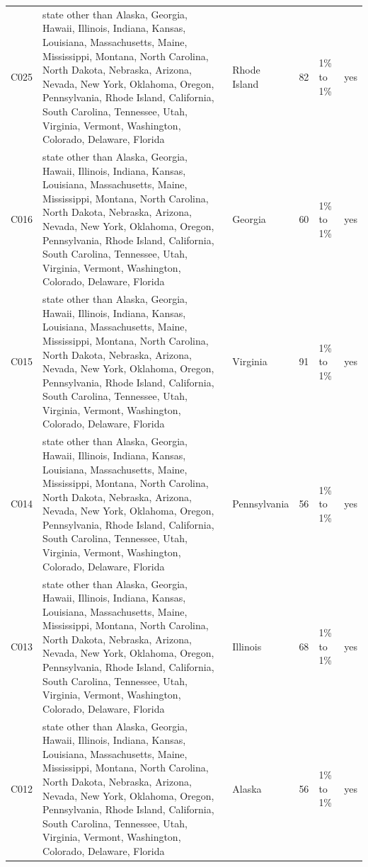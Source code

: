 \documentclass[a4paper,10pt]{article}
\newif\ifreviewmarks
\newcommand{\reviewrule}{\noindent{\color{BrickRed}\rule{\linewidth}{0.8pt}}}
\newenvironment{drafted}[1][]{%
  \ifreviewmarks\par\addvspace{\medskipamount}\reviewrule\par\nopagebreak
  \noindent{\color{BrickRed}\sffamily\footnotesize\textbf{Thesis Draft}\quad #1\hfill review}\par\nopagebreak\smallskip\fi}{%
  \ifreviewmarks\par\smallskip\noindent{\color{BrickRed}\sffamily\footnotesize end of thesis draft}\par\nopagebreak\reviewrule\par\medskip\fi}
\begin{document}
\begin{drafted}[plain-language layer: churn100-s4-c3]
{\begin{longtable}{@{}lllrlc@{}}
C025 & state other than Alaska, Georgia, Hawaii, Illinois, Indiana, Kansas, Louisiana, Massachusetts, Maine, Mississippi, Montana, North Carolina, North Dakota, Nebraska, Arizona, Nevada, New York, Oklahoma, Oregon, Pennsylvania, Rhode Island, California, South Carolina, Tennessee, Utah, Virginia, Vermont, Washington, Colorado, Delaware, Florida & Rhode Island & 82 & 1\% to 1\% & \textcolor{OliveGreen}{yes} \\
C016 & state other than Alaska, Georgia, Hawaii, Illinois, Indiana, Kansas, Louisiana, Massachusetts, Maine, Mississippi, Montana, North Carolina, North Dakota, Nebraska, Arizona, Nevada, New York, Oklahoma, Oregon, Pennsylvania, Rhode Island, California, South Carolina, Tennessee, Utah, Virginia, Vermont, Washington, Colorado, Delaware, Florida & Georgia & 60 & 1\% to 1\% & \textcolor{OliveGreen}{yes} \\
C015 & state other than Alaska, Georgia, Hawaii, Illinois, Indiana, Kansas, Louisiana, Massachusetts, Maine, Mississippi, Montana, North Carolina, North Dakota, Nebraska, Arizona, Nevada, New York, Oklahoma, Oregon, Pennsylvania, Rhode Island, California, South Carolina, Tennessee, Utah, Virginia, Vermont, Washington, Colorado, Delaware, Florida & Virginia & 91 & 1\% to 1\% & \textcolor{OliveGreen}{yes} \\
C014 & state other than Alaska, Georgia, Hawaii, Illinois, Indiana, Kansas, Louisiana, Massachusetts, Maine, Mississippi, Montana, North Carolina, North Dakota, Nebraska, Arizona, Nevada, New York, Oklahoma, Oregon, Pennsylvania, Rhode Island, California, South Carolina, Tennessee, Utah, Virginia, Vermont, Washington, Colorado, Delaware, Florida & Pennsylvania & 56 & 1\% to 1\% & \textcolor{OliveGreen}{yes} \\
C013 & state other than Alaska, Georgia, Hawaii, Illinois, Indiana, Kansas, Louisiana, Massachusetts, Maine, Mississippi, Montana, North Carolina, North Dakota, Nebraska, Arizona, Nevada, New York, Oklahoma, Oregon, Pennsylvania, Rhode Island, California, South Carolina, Tennessee, Utah, Virginia, Vermont, Washington, Colorado, Delaware, Florida & Illinois & 68 & 1\% to 1\% & \textcolor{OliveGreen}{yes} \\
C012 & state other than Alaska, Georgia, Hawaii, Illinois, Indiana, Kansas, Louisiana, Massachusetts, Maine, Mississippi, Montana, North Carolina, North Dakota, Nebraska, Arizona, Nevada, New York, Oklahoma, Oregon, Pennsylvania, Rhode Island, California, South Carolina, Tennessee, Utah, Virginia, Vermont, Washington, Colorado, Delaware, Florida & Alaska & 56 & 1\% to 1\% & \textcolor{OliveGreen}{yes} \\

\end{longtable}}
\end{drafted}
\end{document}
